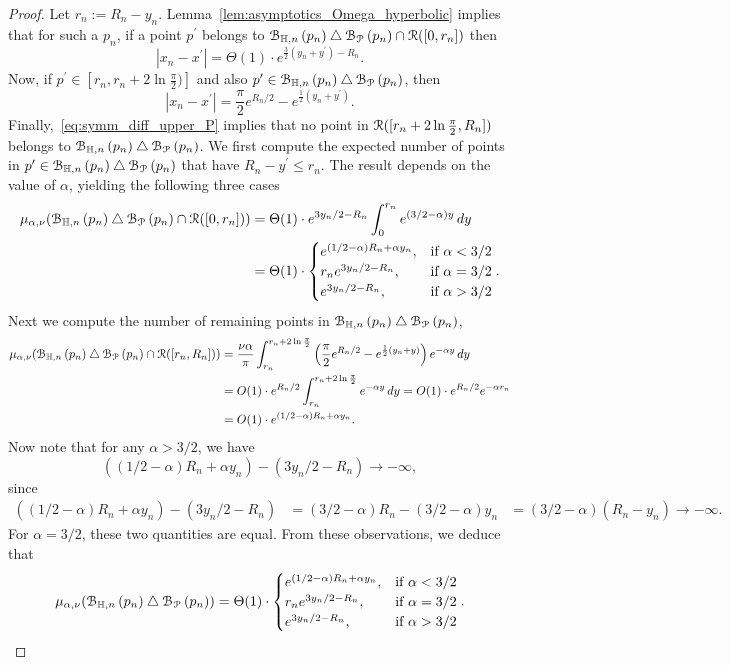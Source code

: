 \begin{proof}
Let $r_n := R_n - y_n$. Lemma~\ref{lem:asymptotics_Omega_hyperbolic} implies that for such a $p_n$, if a point $p^\prime$ belongs to ${\mathcal B}_{\mathbb{H},n}\left(p_n\right) \bigtriangleup {\mathcal B}_{{\mathcal P}}\left(p_n\right) \cap {\mathcal R} ([0,r_n])$ then 
\[
	|x_n - x^\prime| = \Theta(1) \cdot e^{\frac{3}{2} (y_n + y^\prime) - R_n}.
\]
Now, if $p^\prime \in [r_n, r_n + 2 \ln \frac{\pi}{2})]$ and also $p^\prime \in {\mathcal B}_{\mathbb{H},n}\left(p_n\right) \bigtriangleup {\mathcal B}_{{\mathcal P}}\left(p_n\right)$, then 
\[
	|x_n-x^\prime| =\frac{\pi}{2} e^{R_n/2} - e^{\frac{1}{2} (y_n + y^\prime)}.
\]
Finally,~\eqref{eq:symm_diff_upper_P} implies that no point in ${\mathcal R} ([r_n+2\ln \frac{\pi}{2},R_n])$ belongs to ${\mathcal B}_{\mathbb{H},n}\left(p_n\right) \bigtriangleup {\mathcal B}_{{\mathcal P}}\left(p_n\right)$. We first compute the expected number of points in $p^\prime \in {\mathcal B}_{\mathbb{H},n}\left(p_n\right) \bigtriangleup {\mathcal B}_{{\mathcal P}}\left(p_n\right)$ that have $R_n - y^\prime \le r_n$. The result depends on the value of $\alpha$, yielding the following three cases
\begin{align*}
	\mu_{\alpha,\nu} ({\mathcal B}_{\mathbb{H},n}\left(p_n\right) \bigtriangleup {\mathcal B}_{{\mathcal P}}\left(p_n\right) \cap {\mathcal R} ([0,r_n])) 
	&= \Theta(1) \cdot e^{3y_n/2 - R_n}\int_0^{r_n} e^{(3/2-\alpha) y} \, dy \\
	&= \Theta(1)\cdot \begin{cases} e^{(1/2-\alpha)R_n + \alpha y_n}, & \mbox{if } \alpha < 3/2 \\
		r_n e^{3y_n/2 - R_n}, & \mbox{if }\alpha = 3/2\\
		e^{3y_n/2 - R_n}, &  \mbox{if } \alpha > 3/2
	\end{cases}.
\end{align*}
Next we compute the number of remaining points in ${\mathcal B}_{\mathbb{H},n}\left(p_n\right) \bigtriangleup {\mathcal B}_{{\mathcal P}}\left(p_n\right)$, 
\begin{align*}
	\mu_{\alpha,\nu} ({\mathcal B}_{\mathbb{H},n}\left(p_n\right) \bigtriangleup {\mathcal B}_{{\mathcal P}}\left(p_n\right) \cap {\mathcal R} ([r_n, R_n])) 
	&= \frac{\nu\alpha}{\pi} \int_{r_n}^{r_n + 2 \ln \frac{\pi}{2}} 
		\left(\frac{\pi}{2} e^{R_n/2} - e^{\frac{1}{2} (y_n + y)}\right)e^{-\alpha y} \, dy \\
	&= O(1) \cdot e^{R_n/2} \int_{r_n}^{r_n + 2 \ln \frac{\pi}{2}} e^{-\alpha y} \, dy 
		= O(1) \cdot e^{R_n/2} e^{-\alpha r_n} \\
	&=O(1) \cdot e^{(1/2 - \alpha) R_n + \alpha y_n}.
\end{align*}
Now note that for any $\alpha > 3/2$, we have 
\[
	\left( (1/2 - \alpha) R_n + \alpha y_n\right) - \left(3y_n/2 - R_n \right)\to -\infty,
\]
since
\begin{align*}
	\left( (1/2 - \alpha) R_n + \alpha y_n\right) - \left(3y_n/2 - R_n \right) 
	&= (3/2-\alpha )R_n - (3/2 - \alpha) y_n 
	&= (3/2 -\alpha) (R_n- y_n) \to -\infty.
\end{align*}
For $\alpha = 3/2$, these two quantities are equal. From these observations, we deduce that 
\[
	\mu_{\alpha,\nu} ({\mathcal B}_{\mathbb{H},n}\left(p_n\right) \bigtriangleup {\mathcal B}_{{\mathcal P}}\left(p_n\right) ) 
	= \Theta (1) \cdot \begin{cases} 
		e^{(1/2-\alpha)R_n + \alpha y_n}, & \mbox{if } \alpha < 3/2 \\
		r_n e^{3y_n/2 - R_n}, & \mbox{if }\alpha = 3/2\\
		e^{3y_n/2 - R_n}, &  \mbox{if } \alpha > 3/2 
	\end{cases}.
\]
\end{proof}

